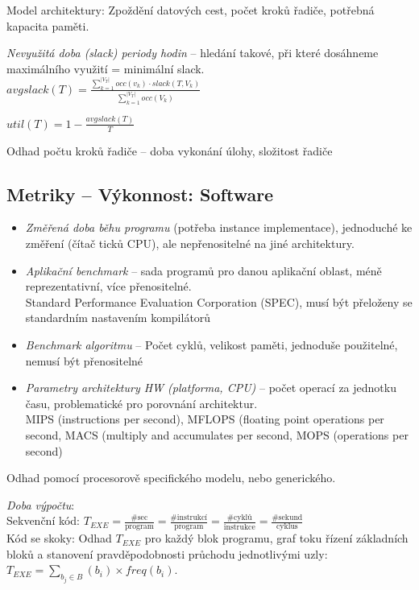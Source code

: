 \documentclass[a4paper, 11pt]{report}
\begin{document}
Model architektury: Zpoždění datových cest, počet kroků řadiče, potřebná kapacita paměti.

\emph{Nevyužitá doba (slack) periody hodin} -- hledání takové, při které dosáhneme maximálního využití = minimální slack.\\
$avgslack(T) = \frac{\sum_{k=1}^{|V_T|} occ( v_k) \cdot slack(T, V_k)}{\sum_{k=1}^{|V_T|} occ(V_k)}$

$util(T) = 1 - \frac{avgslack(T)}{T}$

Odhad počtu kroků řadiče -- doba vykonání úlohy, složitost řadiče

\subsection{Metriky -- Výkonnost: Software}
\begin{itemize}
	\item \emph{Změřená doba běhu programu} (potřeba instance implementace), jednoduché ke změření (čítač ticků CPU), ale nepřenositelné na jiné architektury.
	\item \emph{Aplikační benchmark} -- sada programů pro danou aplikační oblast, méně reprezentativní, více přenositelné.\\
	Standard Performance Evaluation Corporation (SPEC), musí být přeloženy se standardním nastavením kompilátorů
	\item \emph{Benchmark algoritmu} -- Počet cyklů, velikost paměti, jednoduše použitelné, nemusí být přenositelné\\
	\item \emph{Parametry architektury HW (platforma, CPU)} -- počet operací za jednotku času, problematické pro porovnání architektur.\\
	MIPS (instructions per second), MFLOPS (floating point operations per second, MACS (multiply and accumulates per second, MOPS (operations per second)
\end{itemize}

Odhad pomocí procesorově specifického modelu, nebo generického.

\emph{Doba výpočtu}:\\
Sekvenční kód: $T_{EXE} = \frac{\text{\#sec}}{\text{program}} = \frac{\text{\#instrukcí}}{\text{program}} = \frac{\text{\#cyklů}}{\text{instrukce}} = \frac{\text{\#sekund}}{\text{cyklus}}$\\
Kód se skoky: Odhad $T_{EXE}$ pro každý blok programu, graf toku řízení základních bloků a stanovení pravděpodobnosti průchodu jednotlivými uzly: $T_{EXE} = \sum_{b_j \in B}(b_i) \times freq(b_i)$.
\end{document}
